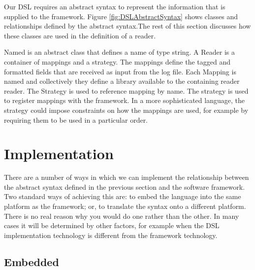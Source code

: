 Our DSL requires an abstract syntax to represent the information 
that is supplied to the framework. Figure \ref{fig:DSLAbstractSyntax} shows 
classes and relationships defined by the abstract syntax.The rest of this 
section discusses how these classes are used in the definition of a reader.

Named is an abstract class that defines a name of type string. A Reader 
is a container of mappings and a strategy. The mappings define the tagged 
and formatted fields that are received as input from the log file. Each 
Mapping is named and collectively they define a library available to the 
containing reader reader. The Strategy is used to reference mapping by name. 
The strategy is used to register mappings with the framework. In a more 
sophisticated language, the strategy could impose constraints on how the 
mappings are used, for example by requiring them to be used in a particular 
order.

\section{Implementation}

There are a number of ways in which we can implement the relationship 
between the abstract syntax defined in the previous section and the 
software framework. Two standard ways of achieving this are: to embed 
the language into the same platform as the framework; or, to translate 
the syntax onto a different platform. There is no real reason why you 
would do one rather than the other. In many cases it will be determined 
by other factors, for example when the DSL implementation technology is 
different from the framework technology.

\subsection{Embedded}

